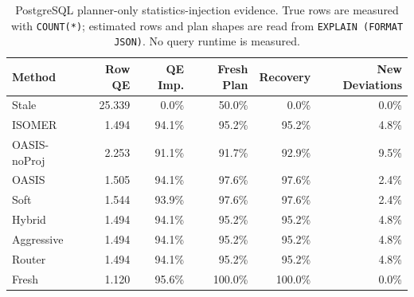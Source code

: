 \begin{table}[t]
  \centering
  \small
  \caption{PostgreSQL planner-only statistics-injection evidence. True rows are measured with \texttt{COUNT(*)}; estimated rows and plan shapes are read from \texttt{EXPLAIN (FORMAT JSON)}. No query runtime is measured.}
  \label{tab:postgres_planner_stats_injection}
  \setlength{\tabcolsep}{4pt}
  \begin{tabular}{lrrrrr}
    \toprule
    Method & Row QE & QE Imp. & Fresh Plan & Recovery & New Deviations \\
    \midrule
    Stale & 25.339 & 0.0\% & 50.0\% & 0.0\% & 0.0\% \\
    ISOMER & 1.494 & 94.1\% & 95.2\% & 95.2\% & 4.8\% \\
    OASIS-noProj & 2.253 & 91.1\% & 91.7\% & 92.9\% & 9.5\% \\
    OASIS & 1.505 & 94.1\% & 97.6\% & 97.6\% & 2.4\% \\
    Soft & 1.544 & 93.9\% & 97.6\% & 97.6\% & 2.4\% \\
    Hybrid & 1.494 & 94.1\% & 95.2\% & 95.2\% & 4.8\% \\
    Aggressive & 1.494 & 94.1\% & 95.2\% & 95.2\% & 4.8\% \\
    Router & 1.494 & 94.1\% & 95.2\% & 95.2\% & 4.8\% \\
    Fresh & 1.120 & 95.6\% & 100.0\% & 100.0\% & 0.0\% \\
    \bottomrule
  \end{tabular}
\end{table}
